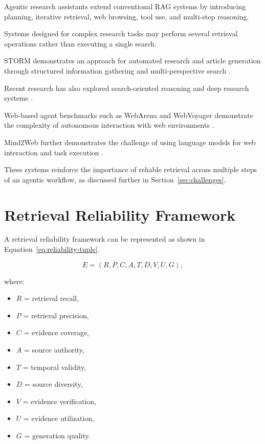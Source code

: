 \documentclass[12pt,a4paper]{article}
\begin{document}
Agentic research assistants extend conventional RAG systems by introducing
planning, iterative retrieval, web browsing, tool use, and multi-step
reasoning.

Systems designed for complex research tasks may perform several retrieval
operations rather than executing a single search.

STORM demonstrates an approach for automated research and article
generation through structured information gathering and multi-perspective
search \cite{shao2024storm}.

Recent research has also explored search-oriented reasoning and deep
research systems \cite{li2025searcho1,zheng2025deepresearcher,
schmidgall2025agentlaboratory}.

Web-based agent benchmarks such as WebArena and WebVoyager demonstrate the
complexity of autonomous interaction with web environments
\cite{zhou2024webarena,he2024webvoyager}.

Mind2Web further demonstrates the challenge of using language models for
web interaction and task execution \cite{deng2023mind2web}.

These systems reinforce the importance of reliable retrieval across
multiple steps of an agentic workflow, as discussed further in
Section~\ref{sec:challenges}.

\section{Retrieval Reliability Framework}
\label{sec:framework}

A retrieval reliability framework can be represented as shown in
Equation~\ref{eq:reliability-tuple}.

\begin{equation}
E = (R,P,C,A,T,D,V,U,G),
\label{eq:reliability-tuple}
\end{equation}

where:

\begin{itemize}
    \item $R$ = retrieval recall,
    \item $P$ = retrieval precision,
    \item $C$ = evidence coverage,
    \item $A$ = source authority,
    \item $T$ = temporal validity,
    \item $D$ = source diversity,
    \item $V$ = evidence verification,
    \item $U$ = evidence utilization,
    \item $G$ = generation quality.
\end{itemize}
\end{document}
